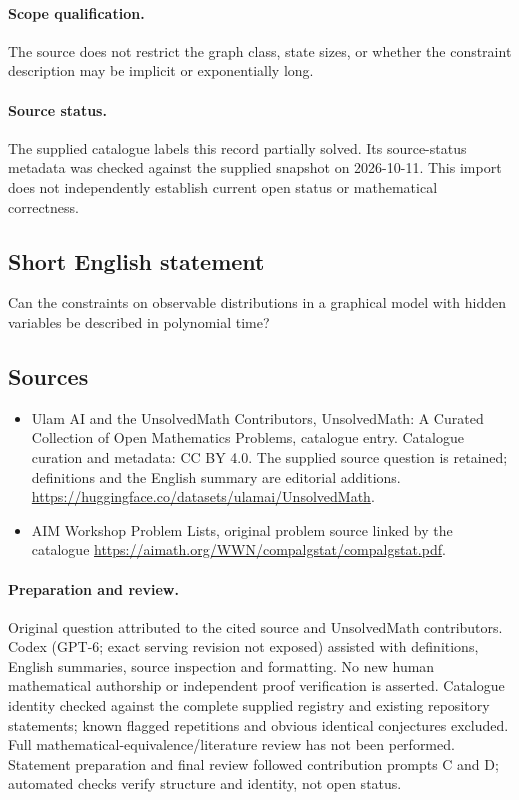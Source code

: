 \documentclass[11pt]{article}
\begin{document}
\paragraph{Scope qualification.}
The source does not restrict the graph class, state sizes, or whether the constraint description may be implicit or exponentially long.
\paragraph{Source status.}
The supplied catalogue labels this record partially solved. Its source-status metadata was checked against the supplied snapshot on 2026-10-11. This import does not independently establish current open status or mathematical correctness.
\subsection{Short English statement}
Can the constraints on observable distributions in a graphical model with hidden variables be described in polynomial time?
\subsection{Sources}
\begin{itemize}
\item[S1] Ulam AI and the UnsolvedMath Contributors, UnsolvedMath: A Curated Collection of Open Mathematics Problems, catalogue entry. Catalogue curation and metadata: CC BY 4.0. The supplied source question is retained; definitions and the English summary are editorial additions.
\url{https://huggingface.co/datasets/ulamai/UnsolvedMath}.
\item[S2] AIM Workshop Problem Lists, original problem source linked by the catalogue
\url{https://aimath.org/WWN/compalgstat/compalgstat.pdf}.
\end{itemize}
\paragraph{Preparation and review.}
Original question attributed to the cited source and UnsolvedMath contributors. Codex (GPT-6; exact serving revision not exposed) assisted with definitions, English summaries, source inspection and formatting. No new human mathematical authorship or independent proof verification is asserted. Catalogue identity checked against the complete supplied registry and existing repository statements; known flagged repetitions and obvious identical conjectures excluded. Full mathematical-equivalence/literature review has not been performed. Statement preparation and final review followed contribution prompts C and D; automated checks verify structure and identity, not open status.
\label{end:statement}
\end{document}
